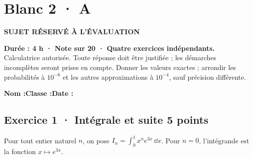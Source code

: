 \fi

\ifmxteacher

\mxnewpage{}\label{sujet:8-3}

\section*{Blanc 2 · A}

{\sffamily\bfseries\color{mxwarn}SUJET RÉSERVÉ À L'ÉVALUATION\par}

\textbf{Durée : 4 h · Note sur 20 · Quatre exercices indépendants.}\\Calculatrice autorisée. Toute réponse doit être justifiée ; les démarches incomplètes seront prises en compte. Donner les valeurs exactes ; arrondir les probabilités à $10^{-6}$ et les autres approximations à $10^{-4}$, sauf précision différente.

\smallskip\textbf{Nom :}\enspace\dotfill\quad\textbf{Classe :}\enspace\dotfill\quad\textbf{Date :}\enspace\dotfill

\subsection*{Exercice 1 · Intégrale et suite \hfill 5 points}Pour tout entier naturel $n$, on pose $I_n=\displaystyle\int_0^1x^ne^{3x}\,\dd x$. Pour $n=0$, l'intégrande est la fonction $x\mapsto e^{3x}$.

